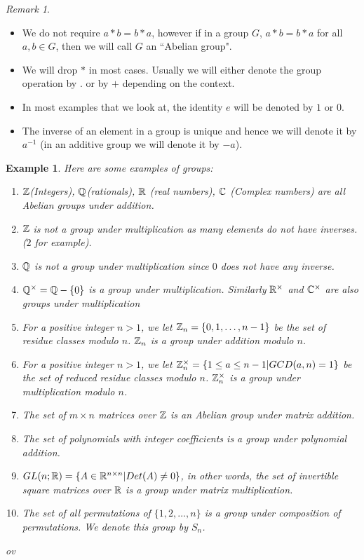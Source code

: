 \documentclass[12pt]{article}
\theoremstyle{plain}
\newtheorem{example}{Example}
\theoremstyle{definition}
\theoremstyle{remark}
\newtheorem{remark}{Remark}
\begin{document}
\begin{remark}
\begin{itemize}
    \item We do not require $a*b=b*a$, however if in a group $G$, $a*b=b*a$ for all $a,b\in G$, then we will call $G$ an ``Abelian group".
    \item We will drop $*$ in most cases. Usually we will either denote the group operation by $.$ or by $+$ depending on the context.
    \item In most examples that we look at, the identity $e$ will be denoted by $1$ or $0$.
    \item The inverse of an element in a group is unique and hence we will denote it by $a^{-1}$ (in an additive group we will denote it by $-a$).
\end{itemize}
\end{remark}
\begin{example}
Here are some examples of groups:
\begin{enumerate}
    \item $\mathbb{Z}$(Integers), $\mathbb{Q}$(rationals), $\mathbb{R}$ (real numbers), $\mathbb{C}$ (Complex numbers) are all Abelian groups under addition.
    \item $\mathbb{Z}$ is not a group under multiplication as many elements do not have inverses. ($2$ for example).
    \item $\mathbb{Q}$ is not a group under multiplication since $0$ does not have any inverse.
    \item $\mathbb{Q}^{\times} = \mathbb{Q}-\{0\}$ is a group under multiplication. Similarly $\mathbb{R}^{\times}$ and $\mathbb{C}^{\times}$ are also groups under multiplication
    \item For a positive integer $n>1$, we let $\mathbb{Z}_n = \{0,1, \dots, n-1\}$ be the set of residue classes modulo $n$. $\mathbb{Z}_n$ is a group under addition modulo $n$.
    \item For a positive integer $n>1$, we let $\mathbb{Z}_n^{\times} = \{1\leq a \leq n-1|GCD(a,n)=1\}$ be the set of reduced residue classes modulo $n$. $\mathbb{Z}_n^{\times}$ is a group under multiplication modulo $n$.
    \item The set of $m\times n$ matrices over $\mathbb{Z}$ is an Abelian group under matrix addition.
    \item The set of polynomials with integer coefficients is a group under polynomial addition.
    \item $GL(n;\mathbb{R}) = \{A\in \mathbb{R}^{n\times n}|Det(A) \neq 0\}$, in other words, the set of invertible square matrices over $\mathbb{R}$ is a group under matrix multiplication.
    \item The set of all permutations of $\{1,2, \dots, n\}$ is a group under composition of permutations. We denote this group by $S_n$.
\end{enumerate}ov
\end{example}
\end{document}
